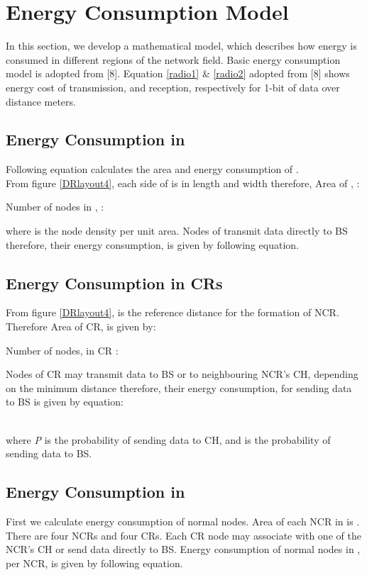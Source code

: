 \documentclass[3p,times,procedia]{elsarticle}
\begin{document}
\section{Energy Consumption Model}
In this section, we develop a mathematical model, which describes how energy is consumed in different regions of the network field. Basic energy consumption model is adopted from [8]. Equation \ref{radio1} \& \ref{radio2} adopted from [8] shows energy cost of transmission,  and reception,  respectively for 1-bit of data over distance  meters.


\subsection{Energy Consumption in }
Following equation calculates the area and energy consumption of .
\\From figure \ref{DRlayout4}, each side of  is  in length and width therefore, Area of ,  :


 Number of nodes in ,  :

where  is the node density per unit area.
  Nodes of  transmit data directly to BS therefore, their energy consumption,  is given by following equation.



\subsection{Energy Consumption in CRs}
From figure \ref{DRlayout4},  is the reference distance for the formation of NCR. Therefore Area of CR,  is given by:

 Number of nodes,  in CR :

 Nodes of CR may transmit data to BS or to neighbouring NCR's CH, depending on the minimum distance therefore, their energy consumption,  for sending data to BS is given by equation:

\\ where \emph{P} is the probability of sending data to CH, and  is the probability of sending data to BS.
\subsection{Energy Consumption in }
First we calculate energy consumption of normal nodes. Area of each NCR in  is . There are four NCRs and four CRs. Each CR node may associate with one of the NCR's CH or send data directly to BS. Energy consumption of normal nodes in , per NCR,  is given by following equation.
\end{document}
